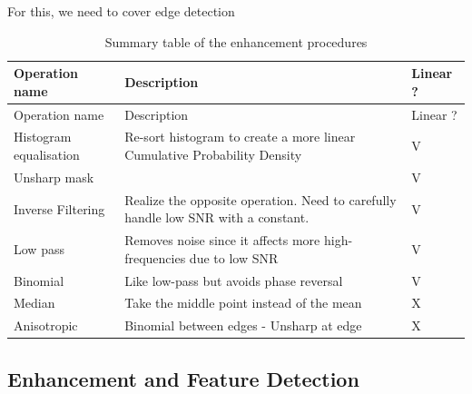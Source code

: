 \documentclass[
  a4paper,
  ,captions=tableheading
]{scrartcl}
\begin{document}
For this, we need to cover edge detection

\begin{longtable}[]{@{}
  >{\raggedright\arraybackslash}p{}
  >{\centering\arraybackslash}p{}
  >{\centering\arraybackslash}p{}@{}}
\caption{Summary table of the enhancement procedures}\tabularnewline
\toprule\noalign{}
\begin{minipage}[b]{\linewidth}\raggedright
Operation name
\end{minipage} & \begin{minipage}[b]{\linewidth}\centering
Description
\end{minipage} & \begin{minipage}[b]{\linewidth}\centering
Linear ?
\end{minipage} \\
\midrule\noalign{}
\endfirsthead
\toprule\noalign{}
\begin{minipage}[b]{\linewidth}\raggedright
Operation name
\end{minipage} & \begin{minipage}[b]{\linewidth}\centering
Description
\end{minipage} & \begin{minipage}[b]{\linewidth}\centering
Linear ?
\end{minipage} \\
\midrule\noalign{}
\endhead
\bottomrule\noalign{}
\endlastfoot
Histogram equalisation & Re-sort histogram to create a more linear
Cumulative Probability Density & V \\
Unsharp mask & & V \\
Inverse Filtering & Realize the opposite operation. Need to carefully
handle low SNR with a constant. & V \\
Low pass & Removes noise since it affects more high-frequencies due to
low SNR & V \\
Binomial & Like low-pass but avoids phase reversal & V \\
Median & Take the middle point instead of the mean & X \\
Anisotropic & Binomial between edges - Unsharp at edge & X \\
\end{longtable}

\subsection{Enhancement and Feature
Detection}\label{enhancement-and-feature-detection-1}
\end{document}
